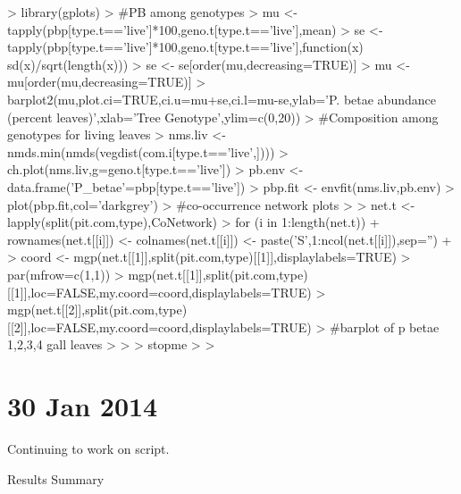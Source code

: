 \documentclass[12pt]{article}
\begin{document}
\begin{Schunk}
\begin{Sinput}
> library(gplots)
>                                         #PB among genotypes
> mu <- tapply(pbp[type.t=='live']*100,geno.t[type.t=='live'],mean)
> se <- tapply(pbp[type.t=='live']*100,geno.t[type.t=='live'],function(x) sd(x)/sqrt(length(x)))
> se <- se[order(mu,decreasing=TRUE)]
> mu <- mu[order(mu,decreasing=TRUE)]
> barplot2(mu,plot.ci=TRUE,ci.u=mu+se,ci.l=mu-se,ylab='P. betae abundance (percent leaves)',xlab='Tree Genotype',ylim=c(0,20))
>                                         #Composition among genotypes for living leaves
> nms.liv <- nmds.min(nmds(vegdist(com.i[type.t=='live',])))
> ch.plot(nms.liv,g=geno.t[type.t=='live'])
> pb.env <- data.frame('P_betae'=pbp[type.t=='live'])
> pbp.fit <- envfit(nms.liv,pb.env)
> plot(pbp.fit,col='darkgrey')
>                                         #co-occurrence network plots
> 
> net.t <- lapply(split(pit.com,type),CoNetwork)
> for (i in 1:length(net.t)){
+   rownames(net.t[[i]]) <- colnames(net.t[[i]]) <- paste('S',1:ncol(net.t[[i]]),sep='')
+ }
> coord <- mgp(net.t[[1]],split(pit.com,type)[[1]],displaylabels=TRUE)
> par(mfrow=c(1,1))
> mgp(net.t[[1]],split(pit.com,type)[[1]],loc=FALSE,my.coord=coord,displaylabels=TRUE)
> mgp(net.t[[2]],split(pit.com,type)[[2]],loc=FALSE,my.coord=coord,displaylabels=TRUE)
>                                         #barplot of p betae 1,2,3,4 gall leaves
> 
> 
> stopme
> 
> 
\end{Sinput}
\end{Schunk}


\section{30 Jan 2014}

Continuing to work on script.

Results Summary
\end{document}
